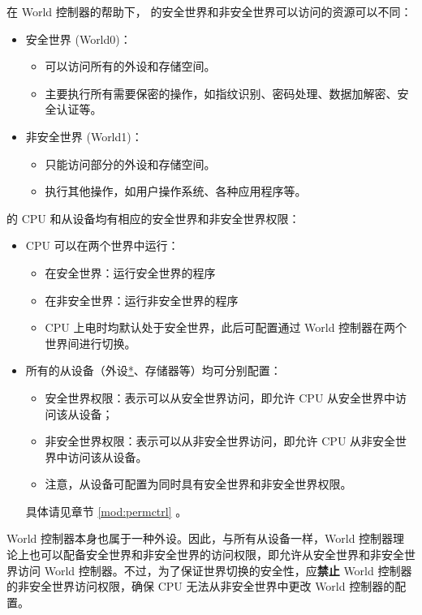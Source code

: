 \documentclass[main\_\_CN.tex]{subfiles}
\begin{document}
在 World 控制器的帮助下，\chipname{} 的安全世界和非安全世界可以访问的资源可以不同：

\begin{itemize}
    \item 安全世界 (World0)：
    \begin{itemize}
        \item 可以访问所有的外设和存储空间。
        \item 主要执行所有需要保密的操作，如指纹识别、密码处理、数据加解密、安全认证等。
    \end{itemize}
    \item 非安全世界 (World1)：
    \begin{itemize}
        \item 只能访问部分的外设和存储空间。
        \item 执行其他操作，如用户操作系统、各种应用程序等。
    \end{itemize}
\end{itemize}


\chipname{} 的 CPU 和从设备均有相应的安全世界和非安全世界权限：
\begin{itemize}
    \item CPU 可以在两个世界中运行：
        \begin{itemize}
            \item 在安全世界：运行安全世界的程序
            \item 在非安全世界：运行非安全世界的程序
            \item CPU 上电时均默认处于安全世界，此后可配置通过 World 控制器在两个世界间进行切换。
        \end{itemize}
    \item 所有的从设备（外设\hyperref[note:wctrl-access]{*}、存储器等）均可分别配置：
        \begin{itemize}
            \item 安全世界权限：表示可以从安全世界访问，即允许 CPU 从安全世界中访问该从设备；
            \item 非安全世界权限：表示可以从非安全世界访问，即允许 CPU 从非安全世界中访问该从设备。
            \item 注意，从设备可配置为同时具有安全世界和非安全世界权限。
        \end{itemize}
        具体请见章节 \ref{mod:permctrl} \textit{}。
\end{itemize}

\begin{tiplisting}\label{note:wctrl-access}
World 控制器本身也属于一种外设。因此，与所有从设备一样，World 控制器理论上也可以配备安全世界和非安全世界的访问权限，即允许从安全世界和非安全世界访问 World 控制器。不过，为了保证世界切换的安全性，应\textbf{禁止} World 控制器的非安全世界访问权限，确保 CPU 无法从非安全世界中更改 World 控制器的配置。
\end{tiplisting}
\end{document}
